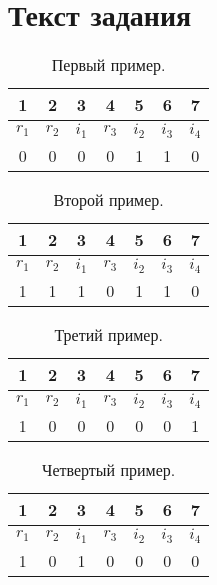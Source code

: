 \section{Текст задания}
\begin{table}[ht]
    \centering
    \begin{tabular}{| c | c | c | c | c | c | c |}
        \hline
        1     & 2     & 3     & 4     & 5     & 6     & 7     \\
        \hline
        $r_1$ & $r_2$ & $i_1$ & $r_3$ & $i_2$ & $i_3$ & $i_4$ \\
        \hline
        0     & 0     & 0     & 0     & 1     & 1     & 0     \\
        \hline
    \end{tabular}
    \caption{Первый пример. }
\end{table}

\begin{table}[ht]
    \centering
    \begin{tabular}{| c | c | c | c | c | c | c |}
        \hline
        1     & 2     & 3     & 4     & 5     & 6     & 7     \\
        \hline
        $r_1$ & $r_2$ & $i_1$ & $r_3$ & $i_2$ & $i_3$ & $i_4$ \\
        \hline
        1     & 1     & 1     & 0     & 1     & 1     & 0     \\
        \hline
    \end{tabular}
    \caption{Второй пример. }
\end{table}

\begin{table}[ht!]
    \centering
    \begin{tabular}{| c | c | c | c | c | c | c |}
        \hline
        1     & 2     & 3     & 4     & 5     & 6     & 7     \\
        \hline
        $r_1$ & $r_2$ & $i_1$ & $r_3$ & $i_2$ & $i_3$ & $i_4$ \\
        \hline
        1     & 0     & 0     & 0     & 0     & 0     & 1     \\
        \hline
    \end{tabular}
    \caption{Третий пример. }
\end{table}

\begin{table}[hbt!]
    \centering
    \begin{tabular}{| c | c | c | c | c | c | c |}
        \hline
        1     & 2     & 3     & 4     & 5     & 6     & 7     \\
        \hline
        $r_1$ & $r_2$ & $i_1$ & $r_3$ & $i_2$ & $i_3$ & $i_4$ \\
        \hline
        1     & 0     & 1     & 0     & 0     & 0     & 0     \\
        \hline
    \end{tabular}
    \caption{Четвертый пример. }
\end{table}

